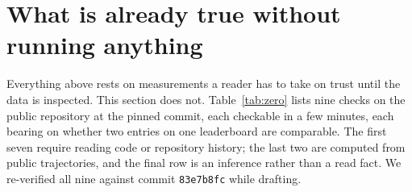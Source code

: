 \section{What is already true without running anything}
\label{sec:zerocompute}

Everything above rests on measurements a reader has to take on trust until the
data is inspected. This section does not. Table~\ref{tab:zero} lists nine
checks on the public repository at the pinned commit, each checkable in a few
minutes, each bearing on whether two entries on one leaderboard are comparable.
The first seven require reading code or repository history; the last two are
computed from public trajectories, and the final row is an inference rather
than a read fact. We re-verified all nine against commit \texttt{83e7b8fc}
while drafting.

